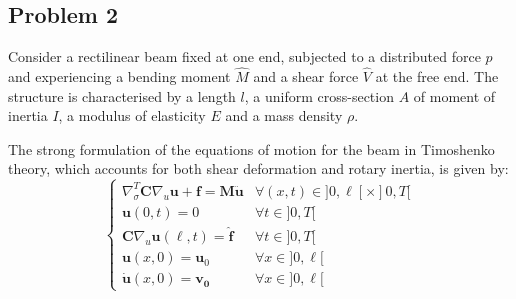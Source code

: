 \documentclass[12pt]{article}
\begin{document}
    \subsection*{Problem 2}
    Consider a rectilinear beam fixed at one end, subjected to a distributed force $p$ and experiencing a bending moment $\hat{M}$ and a shear force $\hat{V}$ at the free end. The structure is characterised by a length $l$, a uniform cross-section $A$ of moment of inertia $I$, a modulus of elasticity $E$ and a mass density $\rho$.
\begin{center}
\end{center}
The strong formulation of the equations of motion for the beam in Timoshenko theory, which accounts for both shear deformation and rotary inertia, is given by:
$$
    \begin{cases}
        \nabla_\sigma^T \mathbf{C} \nabla_u \mathbf{u}+\mathbf{f}=\mathbf{M} \ddot{\mathbf{u}} & \forall (x,t)\in] 0, \ell[\times] 0, T[ \\
        \mathbf{u}(0, t)=0                                                                     & \forall t \in] 0, T[                    \\
        \mathbf{C} \nabla_u \mathbf{u}(\ell, t)=\hat{\mathbf{f}}                               & \forall t \in] 0, T[                    \\
        \mathbf{u}(x, 0)=\mathbf{u}_0                                                          & \forall x \in] 0, \ell[                 \\
        \dot{\mathbf{u}}(x, 0)=\mathbf{v}_{\mathbf{0}}                                         & \forall x \in] 0, \ell[
    \end{cases}
$$
\end{document}
